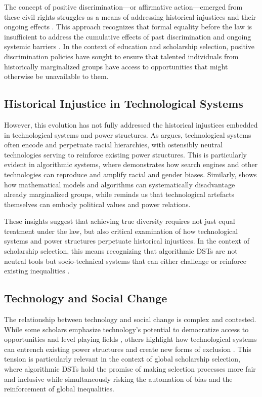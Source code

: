 The concept of positive discrimination—or affirmative action—emerged from these civil rights struggles as a means of addressing historical injustices and their ongoing effects \cite{anderson2010imperative}. This approach recognizes that formal equality before the law is insufficient to address the cumulative effects of past discrimination and ongoing systemic barriers \cite{young1990justice}. In the context of education and scholarship selection, positive discrimination policies have sought to ensure that talented individuals from historically marginalized groups have access to opportunities that might otherwise be unavailable to them.

\subsection{Historical Injustice in Technological Systems}\label{ssec:historical_injustice}
However, this evolution has not fully addressed the historical injustices embedded in technological systems and power structures. As \textcite{benjamin2019race} argues, technological systems often encode and perpetuate racial hierarchies, with ostensibly neutral technologies serving to reinforce existing power structures. This is particularly evident in algorithmic systems, where \textcite{noble2018algorithms} demonstrates how search engines and other technologies can reproduce and amplify racial and gender biases. Similarly, \textcite{oneill2016weapons} shows how mathematical models and algorithms can systematically disadvantage already marginalized groups, while \textcite{winner1980artefacts} reminds us that technological artefacts themselves can embody political values and power relations.

These insights suggest that achieving true diversity requires not just equal treatment under the law, but also critical examination of how technological systems and power structures perpetuate historical injustices. In the context of scholarship selection, this means recognizing that algorithmic DSTs are not neutral tools but socio-technical systems that can either challenge or reinforce existing inequalities \cite{barocas_fairness_2016}.

\subsection{Technology and Social Change}
The relationship between technology and social change is complex and contested. While some scholars emphasize technology's potential to democratize access to opportunities and level playing fields \cite{rheingold2002smart}, others highlight how technological systems can entrench existing power structures and create new forms of exclusion \cite{eubanks2018automating}. This tension is particularly relevant in the context of global scholarship selection, where algorithmic DSTs hold the promise of making selection processes more fair and inclusive while simultaneously risking the automation of bias and the reinforcement of global inequalities.

